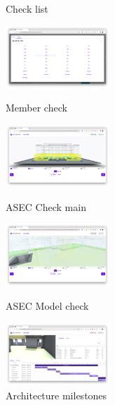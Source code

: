 \begin{figure}[!ht]
\begin{fullwidth}
{			\caption*{Check list}
		}
		\parbox{0.35\textwidth}{
			\centering
			\includegraphics[width=0.35\textwidth]{images/builderhub-supervision-check-member.png}
			\caption*{Member check}
		}\qquad
		\parbox{0.35\textwidth}{
			\centering
			\includegraphics[width=0.35\textwidth]{images/builderhub-supervision-asec.png}
			\caption*{ASEC Check main}
		}\qquad
		\parbox{0.35\textwidth}{
			\centering
			\includegraphics[width=0.35\textwidth]{images/builderhub-supervision-asec-model-check.png}
			\caption*{ASEC Model check}
		}\qquad
		\parbox{0.35\textwidth}{
			\centering
			\includegraphics[width=0.35\textwidth]{images/builderhub-supervision-archi-gantt.png}
			\caption*{Architecture milestones}
		}
	\end{fullwidth}
\end{figure}
